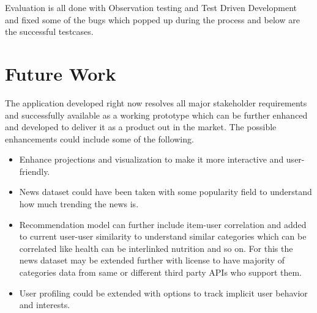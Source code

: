 Evaluation is all done with Observation testing and Test Driven Development and fixed some of the bugs which popped up during the process and below are the successful testcases.


\section{Future Work}

The application developed right now resolves all major stakeholder requirements and successfully available as a working prototype which can be further enhanced and developed to deliver it as a product out in the market.
The possible enhancements could include some of the following.

\begin{itemize}
    \item Enhance projections and visualization to make it more interactive and user-friendly.
    \item News dataset could have been taken with some popularity field to understand how much trending the news is.
    \item Recommendation model can further include item-user correlation and added to current user-user similarity to understand similar categories which can be correlated like health can be interlinked nutrition and so on. For this the news dataset may be extended further with license to have majority of categories data from same or different third party APIs who support them.
    \item User profiling could be extended with options to track implicit user behavior and interests.
\end{itemize}


